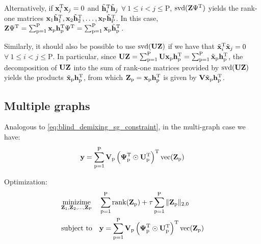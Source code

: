 \documentclass{article}
\newcommand{\numSources}{\text{P}}
\newcommand{\sourceIndex}{\text{p}}
\DeclareMathOperator{\rank}{rank}
\DeclareMathOperator{\svd}{svd}
\DeclareMathOperator{\vect}{vec}
\begin{document}
Alternatively, if ${\mathbf x}_{i}^{{\text{T}}} {\mathbf x}_{j} = 0$ and $\tilde {{\mathbf h}}_{i}^{{\text{T}}} \tilde {{\mathbf h}}_{j}$ $\forall \ 1 \leqslant i < j \leqslant \numSources$, $\svd(\bbZ \Psi^{\rmT})$ yields the rank-one matrices $\bbx_{1} \tilde \bbh_{1}^{\rmT},\bbx_{2} \tilde \bbh_{2}^{\rmT},\ldots,\bbx_{\numSources} \tilde \bbh_{\numSources}^{\rmT}$. In this case, $\bbZ \Psi^{\rmT} = \sum_{\sourceIndex=1}^{\numSources} \bbx_{\sourceIndex} \bbh_{\sourceIndex}^{\rmT} \Psi^{\rmT} = \sum_{\sourceIndex=1}^{\numSources} \bbx_{\sourceIndex} \tilde \bbh_{\sourceIndex}^{\rmT}$.

Similarly, it should also be possible to use $\svd(\bbU \bbZ)$ if we have that $\tilde {{\mathbf x}}_{i}^{{\text{T}}} \tilde {{\mathbf x}}_{j} = 0$ $\forall \ 1 \leqslant i < j \leqslant \numSources$. In particular, since $\bbU \bbZ = \sum_{\sourceIndex=1}^{\numSources} \bbU \bbx_{\sourceIndex} \bbh_{\sourceIndex}^{\rmT} = \sum_{\sourceIndex=1}^{\numSources} \tilde \bbx_{\sourceIndex} \bbh_{\sourceIndex}^{\rmT}$, the decomposition of ${\mathbf U} {\mathbf Z}$ into the sum of rank-one matrices provided by $\svd(\bbU \bbZ)$ yields the products $\tilde \bbx_{\sourceIndex} \bbh_{\sourceIndex}^{\rmT}$, from which $\bbZ_{\sourceIndex} = \bbx_{\sourceIndex} \bbh_{\sourceIndex}^{\rmT}$ is given by $\bbV \tilde \bbx_{\sourceIndex} \bbh_{\sourceIndex}^{\rmT}$.

\subsection*{Multiple graphs}

Analogous to \eqref{eq:blind_demixing_sg_constraint}, in the multi-graph case we have:
\begin{equation}
  \bby = \sum_{\sourceIndex=1}^{\numSources} \bbV_{\sourceIndex} \left(\bbPsi_{\sourceIndex}^{\rmT} \odot \bbU_{\sourceIndex}^{\rmT} \right)^{\rmT} \vect(\bbZ_{\sourceIndex})
\end{equation}

Optimization:
\begin{align}
  \mathop{\text{minizime}}_{\bbZ_{1},\bbZ_{2},\ldots,\bbZ_{\numSources}} \quad & \sum_{\sourceIndex=1}^{\numSources} \rank(\bbZ_{\sourceIndex}) + \tau \sum_{\sourceIndex=1}^{\numSources} \|\bbZ_{\sourceIndex}\|_{2,0} \\
  \text{subject to} \quad & \bby = \sum_{\sourceIndex=1}^{\numSources} \bbV_{\sourceIndex} \left(\bbPsi_{\sourceIndex}^{\rmT} \odot \bbU_{\sourceIndex}^{\rmT} \right)^{\rmT} \vect(\bbZ_{\sourceIndex}) \nonumber
\end{align}
\end{document}
